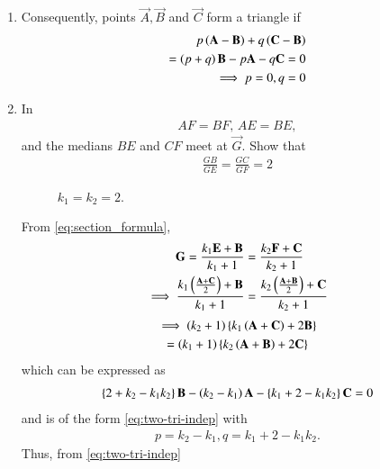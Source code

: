 \begin{enumerate}[label=\thesection.\arabic*.,ref=\thesection.\theenumi]
  \iffalse
  \item Consequently, points $\vec{A},\vec{B}$ and $\vec{C}$ form a triangle  if 
	  \label{prop:two-tri-indep}
  \begin{align}
	  p\left(\mathbf{A}- \mathbf{B}\right) +q\left(\mathbf{C} -\mathbf{B}\right) 
	  \\
	  =\left(p+q\right)\mathbf{B}- p\mathbf{A} -q\mathbf{C} = 0
	  \\
	  \implies p=0, q=0
	  \label{eq:two-tri-indep}
  \end{align}
  \item In 
	\begin{align}
	AF = BF, \,
	AE = BE, 
	\end{align}
	and the medians $BE$ and $CF$ meet at $\vec{G}$.
	Show that 
	\begin{align}
\label{eq:tri_med_centroid_ratio}
	\frac{GB}{GE} = \frac{GC}{GF} = 2
	\end{align}
%
\begin{figure}[!ht]
	\begin{center}
		\resizebox{\columnwidth}{!}{}
	\end{center}
	\caption{$k_1=k_2=2$.}
	\label{fig:tri_med_isect}	
\end{figure}
\solution From 
	  \eqref{eq:section_formula},
  \begin{align}
	  \label{eq:section_formula-G}
\mathbf{G} = 
	   \frac{k_1\mathbf{E}+ \mathbf{B}}{k_1+1}
	  &= \frac{k_2\mathbf{F}+ \mathbf{C}}{k_2+1}
	  \\
	  \implies 
	   \frac{k_1\left(\frac{\mathbf{A}+\mathbf{C}}{2}\right)+ \mathbf{B}}{k_1+1}
	  &= \frac{k_2\left(\frac{\mathbf{A}+\mathbf{B}}{2}\right)+ \mathbf{C}}{k_2+1}
  \end{align}
\begin{multline}
	  \implies 
	\left(k_2+1\right)   \left\{k_1\left({\mathbf{A}+\mathbf{C}}\right)+ 2\mathbf{B}\right\}
	  \\= \left(k_1+1\right)\left\{k_2\left({\mathbf{A}+\mathbf{B}}\right)+ 2\mathbf{C}\right\}
\end{multline}
  which can be expressed as
  \begin{align}
	  \left\{2 + k_2- k_1k_2 \right\}\mathbf{B}-\left(k_2-k_1\right)\mathbf{A}  - \left\{k_1 +2 - k_1k_2\right\}\mathbf{C}
	  =0
  \end{align}
  and is of the form
	  \eqref{eq:two-tri-indep}
	  with 
  \begin{align}
	  p = {k_2-k_1}, q = {k_1 +2 - k_1k_2}.
  \end{align}
  Thus, from 
	  \eqref{eq:two-tri-indep}

\end{enumerate}
